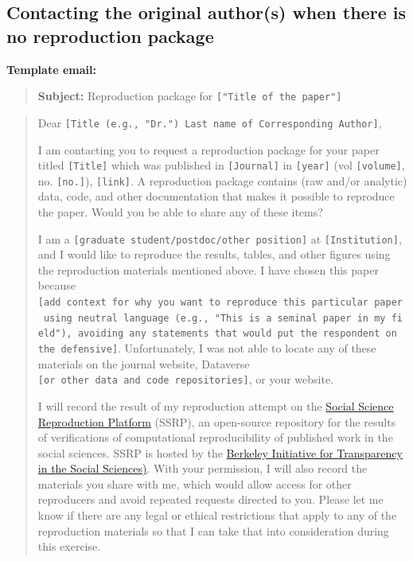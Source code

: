 \documentclass[
]{book}
\begin{document}
\hypertarget{contacting-the-original-authors-when-there-is-no-reproduction-package}{%
\subsection{Contacting the original author(s) when there is no reproduction package}\label{contacting-the-original-authors-when-there-is-no-reproduction-package}}

\textbf{Template email:}

\begin{quote}
\textbf{Subject:} Reproduction package for \texttt{{[}"Title\ of\ the\ paper"{]}}
\end{quote}

\begin{quote}
Dear \texttt{{[}Title\ (e.g.,\ "Dr.")\ Last\ name\ of\ Corresponding\ Author{]}},

I am contacting you to request a reproduction package for your paper titled \texttt{{[}Title{]}} which was published in \texttt{{[}Journal{]}} in \texttt{{[}year{]}} (vol \texttt{{[}volume{]}}, no. \texttt{{[}no.{]}}), \texttt{{[}link{]}}. A reproduction package contains (raw and/or analytic) data, code, and other documentation that makes it possible to reproduce the paper. Would you be able to share any of these items?

I am a \texttt{{[}graduate\ student/postdoc/other\ position{]}} at \texttt{{[}Institution{]}}, and I would like to reproduce the results, tables, and other figures using the reproduction materials mentioned above. I have chosen this paper because \texttt{{[}add\ context\ for\ why\ you\ want\ to\ reproduce\ this\ particular\ paper\ using\ neutral\ language\ (e.g.,\ "This\ is\ a\ seminal\ paper\ in\ my\ field"),\ avoiding\ any\ statements\ that\ would\ put\ the\ respondent\ on\ the\ defensive{]}}. Unfortunately, I was not able to locate any of these materials on the journal website, Dataverse \texttt{{[}or\ other\ data\ and\ code\ repositories{]}}, or your website.

I will record the result of my reproduction attempt on the \href{https://www.socialsciencereproduction.org/}{Social Science Reproduction Platform} (SSRP), an open-source repository for the results of verifications of computational reproducibility of published work in the social sciences. SSRP is hosted by the \href{https://www.bitss.org/}{Berkeley Initiative for Transparency in the Social Sciences)}. With your permission, I will also record the materials you share with me, which would allow access for other reproducers and avoid repeated requests directed to you. Please let me know if there are any legal or ethical restrictions that apply to any of the reproduction materials so that I can take that into consideration during this exercise.


\end{quote}
\end{document}
